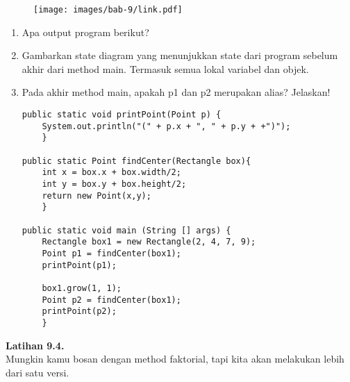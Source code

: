 \begin{figure}[H]
	\centering \texttt{[image: images/bab-9/link.pdf]}
\end{figure}
\begin{enumerate}
	\item Apa output program berikut?
	\item Gambarkan state diagram yang menunjukkan state dari program sebelum akhir dari method main. Termasuk semua lokal variabel dan objek.
	\item Pada akhir method main, apakah p1 dan p2 merupakan alias? Jelaskan!
\begin{lstlisting}
public static void printPoint(Point p) {
	System.out.println("(" + p.x + ", " + p.y + +")");
	}
	
public static Point findCenter(Rectangle box){
	int x = box.x + box.width/2;
	int y = box.y + box.height/2;
	return new Point(x,y);
	}
	
public static void main (String [] args) {
	Rectangle box1 = new Rectangle(2, 4, 7, 9);
	Point p1 = findCenter(box1);
	printPoint(p1);
	
	box1.grow(1, 1);
	Point p2 = findCenter(box1);
	printPoint(p2);
	}
\end{lstlisting}
\end{enumerate}
\textbf{Latihan 9.4.}\\
Mungkin kamu bosan dengan method faktorial, tapi kita akan melakukan lebih dari satu versi.
